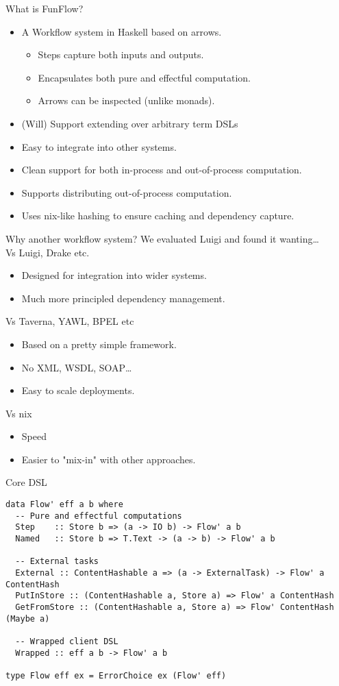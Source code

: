 \documentclass[11pt]{beamer}
\begin{document}
\begin{frame}{What is FunFlow?}
\begin{itemize}
\item A Workflow system in Haskell based on arrows.
\begin{itemize}
\item Steps capture both inputs and outputs.
\item Encapsulates both pure and effectful computation.
\item Arrows can be inspected (unlike monads).
\end{itemize}
\item (Will) Support extending over arbitrary term DSLs
\item Easy to integrate into other systems.
\item Clean support for both in-process and out-of-process computation.
\item Supports distributing out-of-process computation.
\item Uses nix-like hashing to ensure caching and dependency capture.
\end{itemize}
\end{frame}
\begin{frame}{Why another workflow system?}
We evaluated Luigi and found it wanting\dots \\
\pause
Vs Luigi, Drake etc.
\begin{itemize}
\item Designed for integration into wider systems.
\item Much more principled dependency management.
\end{itemize}
\pause
Vs Taverna, YAWL, BPEL etc
\begin{itemize}
\item Based on a pretty simple framework.
\item No XML, WSDL, SOAP\dots
\item Easy to scale deployments.
\end{itemize}
\pause
Vs nix
\begin{itemize}
\item Speed
\item Easier to "mix-in" with other approaches.
\end{itemize}
\end{frame}

\begin{frame}[fragile]{Core DSL}
\begin{lstlisting}[basicstyle=\tiny]
data Flow' eff a b where
  -- Pure and effectful computations
  Step    :: Store b => (a -> IO b) -> Flow' a b
  Named   :: Store b => T.Text -> (a -> b) -> Flow' a b
  
  -- External tasks
  External :: ContentHashable a => (a -> ExternalTask) -> Flow' a ContentHash
  PutInStore :: (ContentHashable a, Store a) => Flow' a ContentHash
  GetFromStore :: (ContentHashable a, Store a) => Flow' ContentHash (Maybe a)
  
  -- Wrapped client DSL
  Wrapped :: eff a b -> Flow' a b

type Flow eff ex = ErrorChoice ex (Flow' eff)
\end{lstlisting}
\end{frame}
\end{document}
